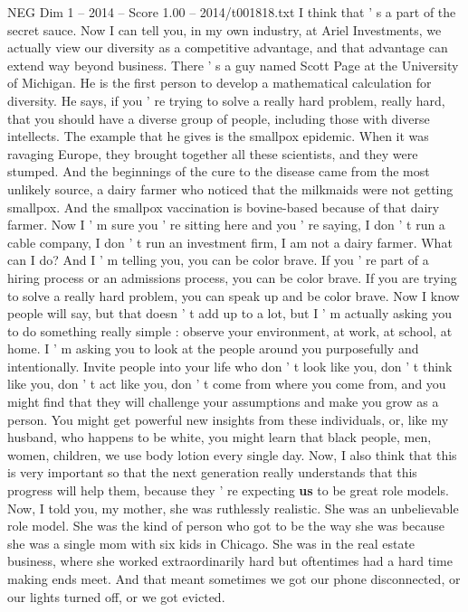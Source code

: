 \begin{textsample}{NEG Dim 1 – 2014 – Score 1.00 – 2014/t001818.txt}
I think that ' s a part of the secret sauce.
Now I can tell you, in my own industry, at Ariel Investments, we actually view our diversity as a competitive advantage, and that advantage can extend way beyond business.
There ' s a guy named Scott Page at the University of Michigan.
He is the first person to develop a mathematical calculation for diversity.
He says, if you ' re trying to solve a really hard problem, really hard, that you should have a diverse group of people, including those with diverse intellects.
The example that he gives is the smallpox epidemic.
When it was ravaging Europe, they brought together all these scientists, and they were stumped.
And the beginnings of the cure to the disease came from the most unlikely source, a dairy farmer who noticed that the milkmaids were not getting smallpox.
And the smallpox vaccination is bovine-based because of that dairy farmer.
Now I ' m sure you ' re sitting here and you ' re saying, I don ' t run a cable company, I don ' t run an investment firm, I am not a dairy farmer.
What can I do?
And I ' m telling you, you can be color brave.
If you ' re part of a hiring process or an admissions process, you can be color brave.
If you are trying to solve a really hard problem, you can speak up and be color brave.
Now I know people will say, but that doesn ' t add up to a lot, but I ' m actually asking you to do something really simple : observe your environment, at work, at school, at home.
I ' m asking you to look at the people around you purposefully and intentionally.
Invite people into your life who don ' t look like you, don ' t think like you, don ' t act like you, don ' t come from where you come from, and you might find that they will challenge your assumptions and make you grow as a person.
You might get powerful new insights from these individuals, or, like my husband, who happens to be white, you might learn that black people, men, women, children, we use body lotion every single day.
Now, I also think that this is very important so that the next generation really understands that this progress will help them, because they ' re expecting \textbf{us} to be great role models.
Now, I told you, my mother, she was ruthlessly realistic.
She was an unbelievable role model.
She was the kind of person who got to be the way she was because she was a single mom with six kids in Chicago.
She was in the real estate business, where she worked extraordinarily hard but oftentimes had a hard time making ends meet.
And that meant sometimes we got our phone disconnected, or our lights turned off, or we got evicted.

\end{textsample}

